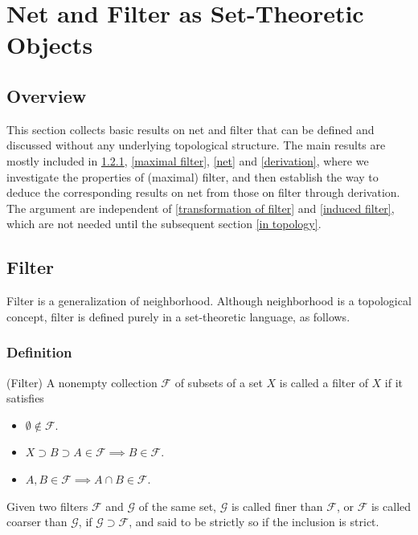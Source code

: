 \documentclass{article}
\begin{document}
\section{Net and Filter as Set-Theoretic Objects} \label{nf as set-theoretic objects}

\subsection{Overview}
This section collects basic results on net and filter that can be defined and discussed without any underlying topological structure.
The main results are mostly included in \ref{filter def}, \ref{maximal filter}, \ref{net} and \ref{derivation},
where we investigate the properties of (maximal) filter, and then establish the way to deduce the corresponding results on net from those on filter through derivation. The argument are independent of \ref{transformation of filter} and \ref{induced filter}, which are not needed until the subsequent section \ref{in topology}.


\subsection{Filter}
Filter is a generalization of neighborhood. Although neighborhood is a topological concept, filter is defined purely in a set-theoretic language, as follows.

\subsubsection{Definition} \label{filter def}
\begin{dfn} (Filter)
    A nonempty collection \( \mathscr{F} \) of subsets of a set \( X \) is called a filter of \( X \) if it satisfies
    \begin{itemize}
        \item \( \emptyset \notin \mathscr{F} \).
        \item \( X \supset B \supset A \in \mathscr{F} \implies B \in \mathscr{F}\).
        \item \( A, B \in \mathscr{F} \implies A \cap B \in \mathscr{F}\).
    \end{itemize}

    Given two filters \( \mathscr{F} \) and \( \mathscr{G} \) of the same set, \( \mathscr{G} \) is called finer than \( \mathscr{F} \), or \( \mathscr{F} \) is called coarser than \( \mathscr{G} \), if \( \mathscr{G} \supset \mathscr{F}\), and said to be strictly so if the inclusion is strict.
\end{dfn}
\end{document}
